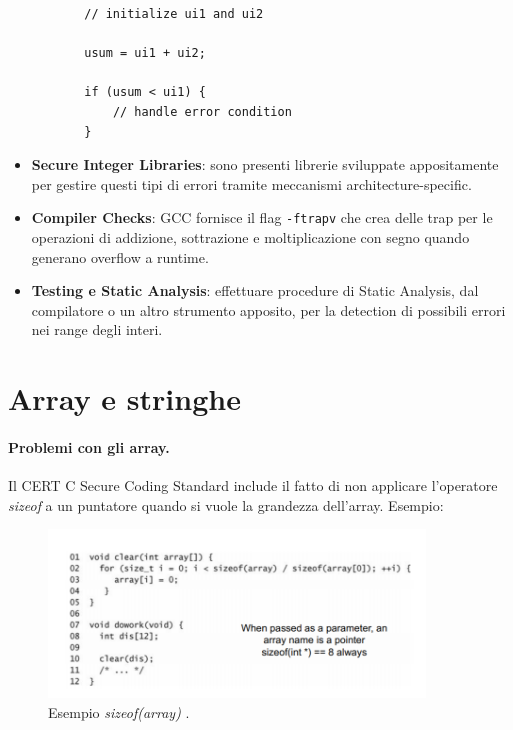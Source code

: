 \begin{itemize}
\begin{itemize}
\begin{lstlisting}
    // initialize ui1 and ui2

    usum = ui1 + ui2;

    if (usum < ui1) {
        // handle error condition
    }
                    \end{lstlisting}
          \end{itemize}
    \item \textbf{Secure Integer Libraries}:
          sono presenti librerie sviluppate appositamente per gestire questi
          tipi di errori tramite meccanismi architecture-specific.
    \item \textbf{Compiler Checks}:
          GCC fornisce il flag \verb|-ftrapv| che crea delle trap per le
          operazioni di addizione, sottrazione e moltiplicazione con segno
          quando generano overflow a runtime.
    \item \textbf{Testing e Static Analysis}:
          effettuare procedure di Static Analysis,
          dal compilatore o un altro strumento apposito,
          per la detection di possibili errori nei range degli interi.
\end{itemize}

\section{Array e stringhe}

\paragraph{Problemi con gli array.}
Il  CERT C Secure Coding Standard include il fatto di non applicare
l'operatore \textit{sizeof} a un puntatore quando si vuole la grandezza dell'array.
Esempio:

\begin{figure}[H]
    \centering
    \includegraphics[width=10cm, keepaspectratio]{capitoli/secure_coding/img/cap_2/sizeof_array.png}
    \caption{Esempio \textit{sizeof(array)} .}\label{fig:sizeof_array}
\end{figure}


